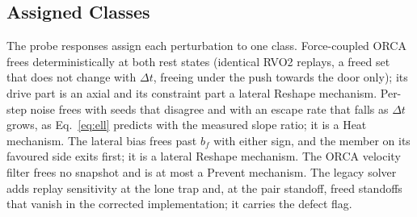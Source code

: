 \subsection{Assigned Classes}\label{sec:classes}
The probe responses assign each perturbation to one class. Force-coupled ORCA frees deterministically at both rest states (identical RVO2 replays, a freed set that does not change with $\Delta t$, freeing under the push towards the door only); its drive part is an axial and its constraint part a lateral Reshape mechanism. Per-step noise frees with seeds that disagree and with an escape rate that falls as $\Delta t$ grows, as Eq.~\eqref{eq:ell} predicts with the measured slope ratio; it is a Heat mechanism. The lateral bias frees past $b_f$ with either sign, and the member on its favoured side exits first; it is a lateral Reshape mechanism. The ORCA velocity filter frees no snapshot and is at most a Prevent mechanism. The legacy solver adds replay sensitivity at the lone trap and, at the pair standoff, freed standoffs that vanish in the corrected implementation; it carries the defect flag.
